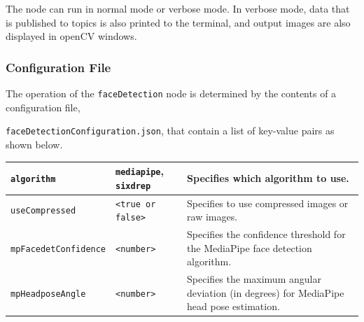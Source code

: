 \documentclass{CSSRforAfrica}
\begin{document}
The node can run in normal mode or verbose mode. In verbose mode, data that is published to topics is also printed to the terminal, and output images are also displayed in openCV windows.

\newpage

\subsubsection*{Configuration File}


The operation of the {\small \verb+faceDetection+} node is determined by the contents of a configuration file, {\small \texttt{faceDetectionConfiguration.json}, that  contain a list of key-value pairs as shown below.  

\begin{center}
\begin{tabularx}{\linewidth}{| l | l | X|}
\hline
{\footnotesize \texttt{algorithm} }  & {\footnotesize \texttt{mediapipe}, \texttt{sixdrep}}   & {\small Specifies which algorithm to use.} \\
\hline
{\footnotesize \texttt{useCompressed} }  & {\footnotesize \texttt{<true or false>}}     & {\small Specifies to use compressed images or raw images.} \\
\hline
{\footnotesize \texttt{mpFacedetConfidence} }  & {\footnotesize \texttt{<number>}}     & {\small Specifies the confidence threshold for the MediaPipe face detection algorithm.} \\
\hline
{\footnotesize \texttt{mpHeadposeAngle} }  & {\footnotesize \texttt{<number>}}     & {\small Specifies the maximum angular deviation (in degrees) for MediaPipe head pose estimation.} \\

\end{tabularx}
\end{center}}
\end{document}
